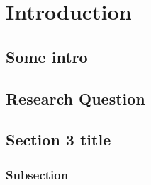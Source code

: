 \chapter{Introduction}

\section{Some intro}

\section{Research Question}

\section{Section 3 title}

\subsection{Subsection}

\cite{latexcompanion}